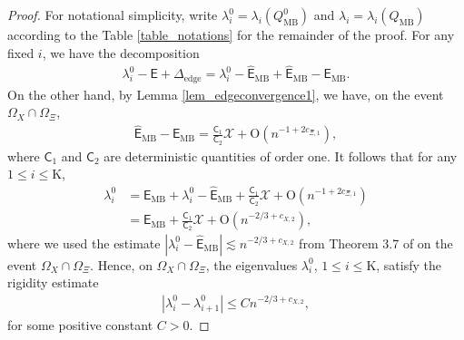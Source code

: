 \documentclass[12pt]{article}
\theoremstyle{plain}
\numberwithin{equation}{section}
\begin{document}
\begin{proof}
	For notational simplicity, write $\lambda_i^0=\lambda_i(Q_{\mathrm{MB}}^0)$ and $\lambda_i=\lambda_i(Q_{\mathrm{MB}})$ according to the Table \ref{table_notations} for the remainder of the proof. For any fixed $i$, we have the decomposition
	\begin{align*}
		\lambda_i^0-\mathsf{E}+\Delta_{\mathrm{edge}}=\lambda_i^0-\widehat{\mathsf{E}}_{\mathrm{MB}}+\widehat{\mathsf{E}}_{\mathrm{MB}}-\mathsf{E}_{\mathrm{MB}}.
	\end{align*}
	On the other hand, by Lemma \ref{lem_edgeconvergence1}, we have, on the event $\Omega_X\cap\Omega_{\Xi}$,
	\begin{align*}
		\widehat{\mathsf{E}}_{\mathrm{MB}}-\mathsf{E}_{\mathrm{MB}}=\frac{\mathsf{C}_1}{\mathsf{C}_2}\mathcal{X}+\mathrm{O}(n^{-1+2c_{\Xi,1}}),
	\end{align*}
	where $\mathsf{C}_1$ and $\mathsf{C}_2$ are deterministic quantities of order one. It follows that for any $1\leq i\leq \mathrm{K}$,
	\begin{align}
		\lambda_i^0&=\mathsf{E}_{\mathrm{MB}}+\lambda_i^0-\widehat{\mathsf{E}}_{\mathrm{MB}}+\frac{\mathsf{C}_1}{\mathsf{C}_2}\mathcal{X}+\mathrm{O}(n^{-1+2c_{\Xi,1}})\\
		&=\mathsf{E}_{\mathrm{MB}}+\frac{\mathsf{C}_1}{\mathsf{C}_2}\mathcal{X}+\mathrm{O}(n^{-2/3+c_{X,2}}),
	\end{align}
	where we used the estimate $|\lambda_i^0-\widehat{\mathsf{E}}_{\mathrm{MB}}|\lesssim n^{-2/3+c_{X,2}}$ from Theorem 3.7 of \citep{ding2021spiked} on the event $\Omega_X\cap\Omega_{\Xi}$. Hence, on $\Omega_X\cap\Omega_{\Xi}$, the eigenvalues $\lambda_i^0$, $1\leq i\le \mathrm{K}$, satisfy the rigidity estimate
	\begin{align}\label{eq_rigidity_lambda0}
		|\lambda_i^0-\lambda_{i+1}^0|\leq Cn^{-2/3+c_{X,2}},
	\end{align}
	for some positive constant $C>0$.
	

\end{proof}
\end{document}
